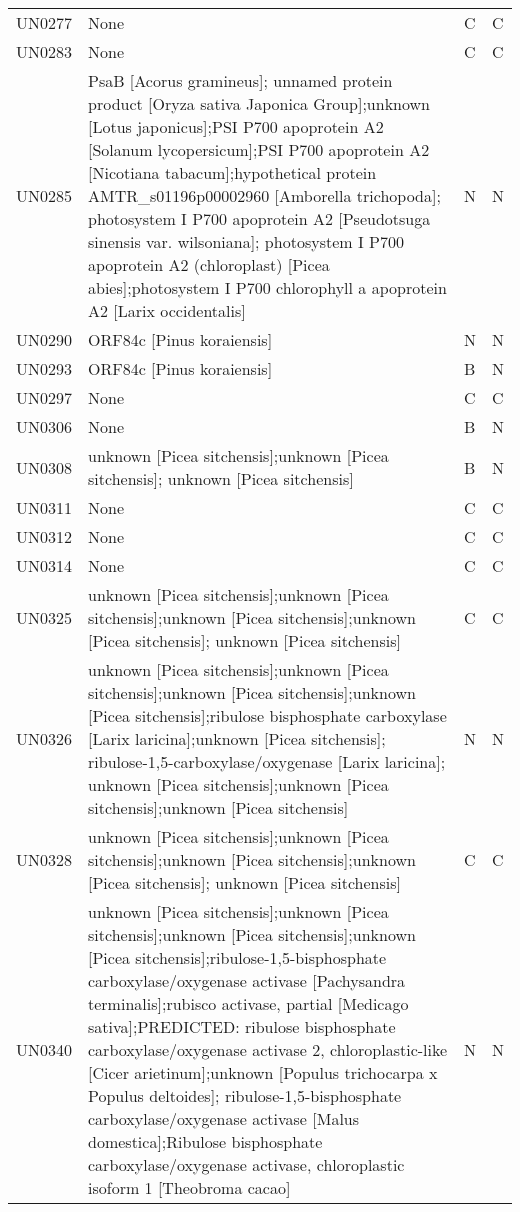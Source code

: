 \begin{longtable}{llll}
UN0277 &  None &  C &  C \\
UN0283 &  None &  C &  C \\
UN0285 &  PsaB [Acorus gramineus]; unnamed protein product [Oryza sativa Japonica Group];unknown [Lotus japonicus];PSI P700 apoprotein A2 [Solanum lycopersicum];PSI P700 apoprotein A2 [Nicotiana tabacum];hypothetical protein AMTR\_s01196p00002960 [Amborella trichopoda]; photosystem I P700 apoprotein A2 [Pseudotsuga sinensis var. wilsoniana]; photosystem I P700 apoprotein A2 (chloroplast) [Picea abies];photosystem I P700 chlorophyll a apoprotein A2 [Larix occidentalis] &  N &  N \\
UN0290 &  ORF84c [Pinus koraiensis] &  N &  N \\
UN0293 &  ORF84c [Pinus koraiensis] &  B &  N \\
UN0297 &  None &  C &  C \\
UN0306 &  None &  B &  N \\
UN0308 &   unknown [Picea sitchensis];unknown [Picea sitchensis]; unknown [Picea sitchensis] &  B &  N \\
UN0311 &  None &  C &  C \\
UN0312 &  None &  C &  C \\
UN0314 &  None &  C &  C \\
UN0325 &  unknown [Picea sitchensis];unknown [Picea sitchensis];unknown [Picea sitchensis];unknown [Picea sitchensis]; unknown [Picea sitchensis] &  C &  C \\
UN0326 &  unknown [Picea sitchensis];unknown [Picea sitchensis];unknown [Picea sitchensis];unknown [Picea sitchensis];ribulose bisphosphate carboxylase [Larix laricina];unknown [Picea sitchensis]; ribulose-1,5-carboxylase/oxygenase [Larix laricina]; unknown [Picea sitchensis];unknown [Picea sitchensis];unknown [Picea sitchensis] &  N &  N \\
UN0328 &  unknown [Picea sitchensis];unknown [Picea sitchensis];unknown [Picea sitchensis];unknown [Picea sitchensis]; unknown [Picea sitchensis] &  C &  C \\
UN0340 &  unknown [Picea sitchensis];unknown [Picea sitchensis];unknown [Picea sitchensis];unknown [Picea sitchensis];ribulose-1,5-bisphosphate carboxylase/oxygenase activase [Pachysandra terminalis];rubisco activase, partial [Medicago sativa];PREDICTED: ribulose bisphosphate carboxylase/oxygenase activase 2, chloroplastic-like [Cicer arietinum];unknown [Populus trichocarpa x Populus deltoides]; ribulose-1,5-bisphosphate carboxylase/oxygenase activase [Malus domestica];Ribulose bisphosphate carboxylase/oxygenase activase, chloroplastic isoform 1 [Theobroma cacao] &  N &  N \\

\end{longtable}
